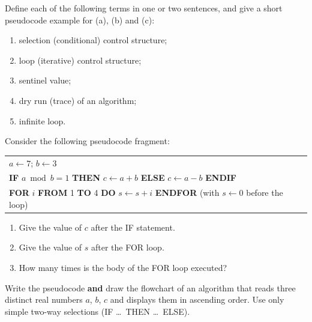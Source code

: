\documentclass[11pt]{article}
\newcounter{popsec}
\newcounter{popsub}
\newcommand{\courssub}[1]{%
  \stepcounter{popsub}%
  \par\vspace{9pt}\noindent{\popxbold\fontsize{11.5}{13}\selectfont\color{popink}{\color{poporange}\thepopsec.\thepopsub}\hspace{6pt}#1}\par\nopagebreak\vspace{4pt}
}
\begin{document}
\begin{exercice}[Definitions]
Define each of the following terms in one or two sentences, and give a short pseudocode example for (a), (b) and (c):
\begin{enumerate}
\item selection (conditional) control structure;
\item loop (iterative) control structure;
\item sentinel value;
\item dry run (trace) of an algorithm;
\item infinite loop.
\end{enumerate}
\end{exercice}

\begin{exercice}
Consider the following pseudocode fragment:
\begin{center}
\begin{tabular}{l}
$a \leftarrow 7$; \quad $b \leftarrow 3$\\
\textbf{IF} $a \bmod b = 1$ \textbf{THEN} $c \leftarrow a + b$ \textbf{ELSE} $c \leftarrow a - b$ \textbf{ENDIF}\\
\textbf{FOR} $i$ \textbf{FROM} 1 \textbf{TO} 4 \textbf{DO} $s \leftarrow s + i$ \textbf{ENDFOR} \quad (with $s \leftarrow 0$ before the loop)
\end{tabular}
\end{center}
\begin{enumerate}
\item Give the value of $c$ after the IF statement.
\item Give the value of $s$ after the FOR loop.
\item How many times is the body of the FOR loop executed?
\end{enumerate}
\end{exercice}

\courssub{I practise}

\begin{exercice}
Write the pseudocode \textbf{and} draw the flowchart of an algorithm that reads three distinct real numbers $a$, $b$, $c$ and displays them in ascending order. Use only simple two-way selections (IF \ldots\ THEN \ldots\ ELSE).
\end{exercice}
\end{document}
